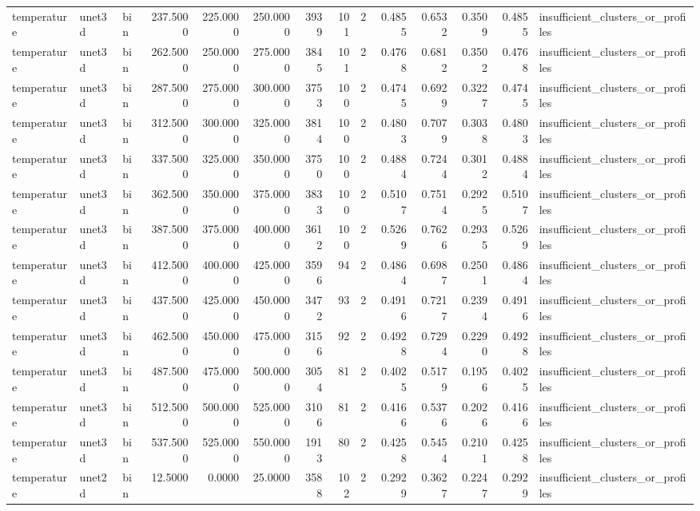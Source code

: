 \begin{tabular}{lllrrrrrrrrrrl}
temperature & unet3d & bin & 237.5000 & 225.0000 & 250.0000 & 3939 & 101 & 2 & 0.4855 & 0.6532 & 0.3509 & 0.4855 & insufficient_clusters_or_profiles \\
temperature & unet3d & bin & 262.5000 & 250.0000 & 275.0000 & 3845 & 101 & 2 & 0.4768 & 0.6812 & 0.3502 & 0.4768 & insufficient_clusters_or_profiles \\
temperature & unet3d & bin & 287.5000 & 275.0000 & 300.0000 & 3753 & 100 & 2 & 0.4745 & 0.6929 & 0.3227 & 0.4745 & insufficient_clusters_or_profiles \\
temperature & unet3d & bin & 312.5000 & 300.0000 & 325.0000 & 3814 & 100 & 2 & 0.4803 & 0.7079 & 0.3038 & 0.4803 & insufficient_clusters_or_profiles \\
temperature & unet3d & bin & 337.5000 & 325.0000 & 350.0000 & 3750 & 100 & 2 & 0.4884 & 0.7244 & 0.3012 & 0.4884 & insufficient_clusters_or_profiles \\
temperature & unet3d & bin & 362.5000 & 350.0000 & 375.0000 & 3833 & 100 & 2 & 0.5107 & 0.7514 & 0.2925 & 0.5107 & insufficient_clusters_or_profiles \\
temperature & unet3d & bin & 387.5000 & 375.0000 & 400.0000 & 3612 & 100 & 2 & 0.5269 & 0.7626 & 0.2935 & 0.5269 & insufficient_clusters_or_profiles \\
temperature & unet3d & bin & 412.5000 & 400.0000 & 425.0000 & 3596 & 94 & 2 & 0.4864 & 0.6987 & 0.2501 & 0.4864 & insufficient_clusters_or_profiles \\
temperature & unet3d & bin & 437.5000 & 425.0000 & 450.0000 & 3472 & 93 & 2 & 0.4916 & 0.7217 & 0.2394 & 0.4916 & insufficient_clusters_or_profiles \\
temperature & unet3d & bin & 462.5000 & 450.0000 & 475.0000 & 3156 & 92 & 2 & 0.4928 & 0.7294 & 0.2290 & 0.4928 & insufficient_clusters_or_profiles \\
temperature & unet3d & bin & 487.5000 & 475.0000 & 500.0000 & 3054 & 81 & 2 & 0.4025 & 0.5179 & 0.1956 & 0.4025 & insufficient_clusters_or_profiles \\
temperature & unet3d & bin & 512.5000 & 500.0000 & 525.0000 & 3106 & 81 & 2 & 0.4166 & 0.5376 & 0.2026 & 0.4166 & insufficient_clusters_or_profiles \\
temperature & unet3d & bin & 537.5000 & 525.0000 & 550.0000 & 1913 & 80 & 2 & 0.4258 & 0.5454 & 0.2101 & 0.4258 & insufficient_clusters_or_profiles \\
temperature & unet2d & bin & 12.5000 & 0.0000 & 25.0000 & 3588 & 102 & 2 & 0.2929 & 0.3627 & 0.2247 & 0.2929 & insufficient_clusters_or_profiles \\

\end{tabular}
